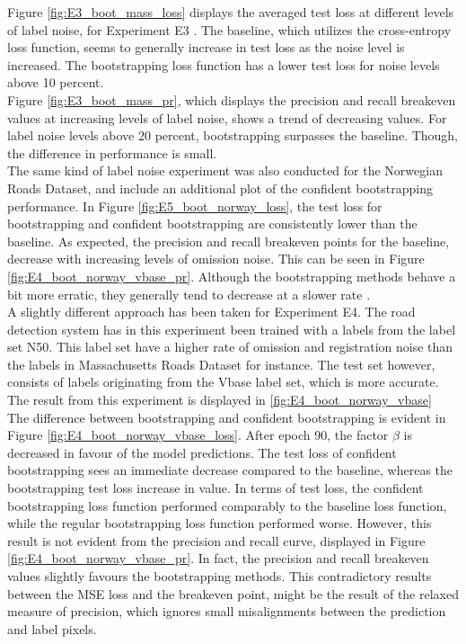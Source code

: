 Figure \ref{fig:E3_boot_mass_loss} displays the averaged test loss at different levels of label noise, for Experiment E3 . The baseline, which utilizes the cross-entropy loss function, seems to generally increase in test loss as the noise level is increased. The bootstrapping loss function has a lower test loss for noise levels above 10 percent.\\

Figure \ref{fig:E3_boot_mass_pr}, which displays the precision and recall breakeven values at increasing levels of label noise, shows a trend of decreasing values.  For label noise levels above 20 percent, bootstrapping surpasses the baseline. Though, the difference in performance is small.\\

The same kind of label noise experiment was also conducted for the Norwegian Roads Dataset, and include an additional plot of the confident bootstrapping performance. In Figure \ref{fig:E5_boot_norway_loss}, the test loss for bootstrapping and confident bootstrapping are consistently lower than the baseline. As expected, the precision and recall breakeven points for the baseline, decrease with increasing levels of omission noise. This can be seen in Figure \ref{fig:E4_boot_norway_vbase_pr}. Although the bootstrapping methods behave a bit more erratic, they generally tend to decrease at a slower rate .\\

A slightly different approach has been taken for Experiment E4. The road detection system has in this experiment been trained with a labels from the label set N50. This label set have a higher rate of omission and registration noise than the labels in Massachusetts Roads Dataset for instance. The test set however, consists of labels originating from the Vbase label set, which is more accurate. The result from this experiment is displayed in \ref{fig:E4_boot_norway_vbase}\\

The difference between bootstrapping and confident bootstrapping is evident in Figure \ref{fig:E4_boot_norway_vbase_loss}. After epoch 90, the factor $\beta$ is decreased in favour of the model predictions. The test loss of confident bootstrapping sees an immediate decrease compared to the baseline, whereas the bootstrapping test loss increase in value. In terms of test loss, the confident bootstrapping loss function performed comparably to the baseline loss function, while the regular bootstrapping loss function performed worse. However, this result is not evident from the precision and recall curve, displayed in Figure \ref{fig:E4_boot_norway_vbase_pr}. In fact, the precision and recall breakeven values slightly favours the bootstrapping methods. This contradictory results between the MSE loss and the breakeven point, might be the result of the relaxed measure of precision, which ignores small misalignments between the prediction and label pixels.\\

